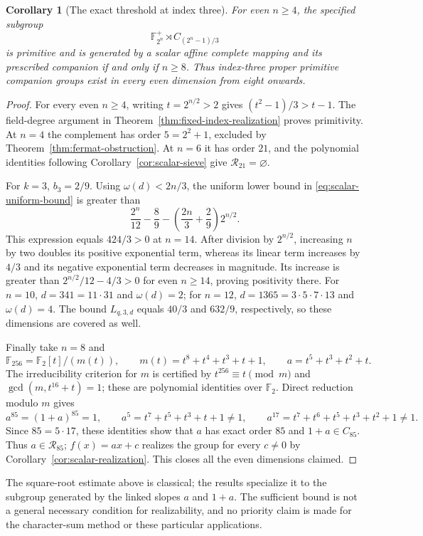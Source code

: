 \documentclass[11pt]{article}
\newtheorem{corollary}[theorem]{Corollary}
\begin{document}
\begin{corollary}[The exact threshold at index three]
\label{cor:index-three-realization}
For even $n\ge4$, the specified subgroup
\[
 \mathbb F_{2^n}^+\rtimes C_{(2^n-1)/3}
\]
is primitive and is generated by a scalar affine complete mapping
and its prescribed companion if and only if $n\ge8$.
Thus index-three proper primitive companion groups exist in every
even dimension from eight onwards.
\end{corollary}
\begin{proof}
For every even $n\ge4$, writing $t=2^{n/2}>2$ gives
$(t^2-1)/3>t-1$. The field-degree argument in
Theorem~\ref{thm:fixed-index-realization} proves primitivity.
At $n=4$ the complement has order $5=2^2+1$, excluded by
Theorem~\ref{thm:fermat-obstruction}. At $n=6$ it has order $21$,
and the polynomial identities following Corollary~\ref{cor:scalar-sieve}
give $\mathcal R_{21}=\varnothing$.

For $k=3$, $b_3=2/9$. Using $\omega(d)<2n/3$, the uniform lower
bound in \eqref{eq:scalar-uniform-bound} is greater than
\[
 \frac{2^n}{12}-\frac89-
 \left(\frac{2n}{3}+\frac29\right)2^{n/2}.
\]
This expression equals $424/3>0$ at $n=14$. After division by $2^{n/2}$,
increasing $n$ by two doubles its positive exponential term,
whereas its linear term increases by $4/3$ and its negative
exponential term decreases in magnitude. Its increase is greater than
$2^{n/2}/12-4/3>0$ for even $n\ge14$, proving positivity there.
For $n=10$, $d=341=11\cdot31$ and $\omega(d)=2$;
for $n=12$, $d=1365=3\cdot5\cdot7\cdot13$ and $\omega(d)=4$.
The bound $L_{q,3,d}$ equals $40/3$ and $632/9$, respectively,
so these dimensions are covered as well.

Finally take $n=8$ and
\[
 \mathbb F_{256}=\mathbb F_2[t]/(m(t)),\qquad
 m(t)=t^8+t^4+t^3+t+1,
 \qquad a=t^5+t^3+t^2+t.
\]
The irreducibility criterion for $m$ is certified by
$t^{256}\equiv t\pmod m$ and
$\gcd(m,t^{16}+t)=1$; these are polynomial identities over $\mathbb F_2$.
Direct reduction modulo $m$ gives
\[
 a^{85}=(1+a)^{85}=1,\qquad
 a^5=t^7+t^5+t^3+t+1\ne1,\qquad
 a^{17}=t^7+t^6+t^5+t^3+t^2+1\ne1.
\]
Since $85=5\cdot17$, these identities show that $a$ has exact order
$85$ and $1+a\in C_{85}$. Thus $a\in\mathcal R_{85}$;
$f(x)=ax+c$ realizes the group for every $c\ne0$ by
Corollary~\ref{cor:scalar-realization}.
This closes all the even dimensions claimed.
\end{proof}

The square-root estimate above is classical; the results specialize it
to the subgroup generated by the linked slopes $a$ and $1+a$.
The sufficient bound is not a general necessary condition for
realizability, and no priority claim is made for the character-sum
method or these particular applications.
\end{document}
